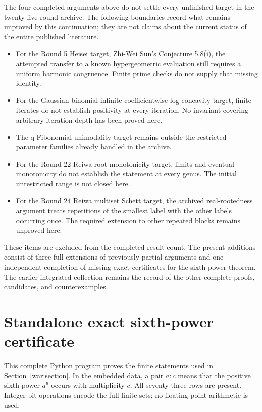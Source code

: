 \documentclass[11pt,a4paper]{article}
\numberwithin{equation}{section}
\theoremstyle{remark}
\begin{document}
The four completed arguments above do not settle every unfinished
target in the twenty-five-round archive. The following boundaries
record what remains unproved by this continuation; they are not
claims about the current status of the entire published literature.

\begin{itemize}
\item For the Round 5 Heisei target, Zhi-Wei Sun's Conjecture 5.8(i),
the attempted transfer to a known hypergeometric evaluation still
requires a uniform harmonic congruence. Finite prime checks do not
supply that missing identity.
\item For the Gaussian-binomial infinite coefficientwise
log-concavity target, finite iterates do not establish positivity
at every iteration. No invariant covering arbitrary iteration
depth has been proved here.
\item The q-Fibonomial unimodality target remains outside the
restricted parameter families already handled in the archive.
\item For the Round 22 Reiwa root-monotonicity target, limits and
eventual monotonicity do not establish the statement at every
genus. The initial unrestricted range is not closed here.
\item For the Round 24 Reiwa multiset Schett target, the archived
real-rootedness argument treats repetitions of the smallest label
with the other labels occurring once. The required extension to
other repeated blocks remains unproved here.
\end{itemize}

These items are excluded from the completed-result count. The
present additions consist of three full extensions of previously
partial arguments and one independent completion of missing exact
certificates for the sixth-power theorem. The earlier integrated
collection remains the record of the other complete proofs,
candidates, and counterexamples.

\clearpage\appendix
\section{Standalone exact sixth-power certificate}
\label{app:certificate}
This complete Python program proves the finite statements used in
Section~\ref{war:section}. In the embedded data, a pair $a:c$ means
that the positive sixth power $a^6$ occurs with multiplicity $c$.
All seventy-three rows are present. Integer bit operations encode
the full finite sets; no floating-point arithmetic is used.
\end{document}

